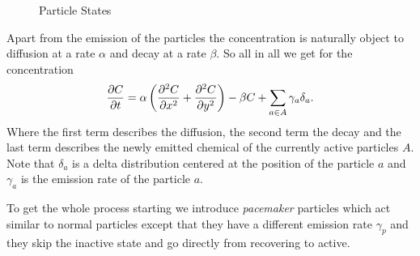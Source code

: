 \documentclass{class}
\begin{document}
\begin{figure}
    \centering
    \caption{Particle States}
    \label{fig:states}
\end{figure}

Apart from the emission of the particles the concentration is naturally object to diffusion at a rate $\alpha$ and decay at a rate $\beta$.
So all in all we get for the concentration
\begin{align}\label{eq:C}
    \pdv{C}{t}=\alpha\left(\pdv[2]{C}{x}+\pdv[2]{C}{y}\right)-\beta C+\sum_{a\in A}\gamma_a\delta_a.
\end{align}
Where the first term describes the diffusion, the second term the decay and the last term describes the newly emitted chemical of the currently active particles $A$.
Note that $\delta_a$ is a delta distribution centered at the position of the particle $a$ and $\gamma_a$ is the emission rate of the particle $a$.

To get the whole process starting we introduce \emph{pacemaker} particles which act similar to normal particles except that they have a different emission rate $\gamma_p$ and they skip the inactive state and go directly from recovering to active.
\end{document}
